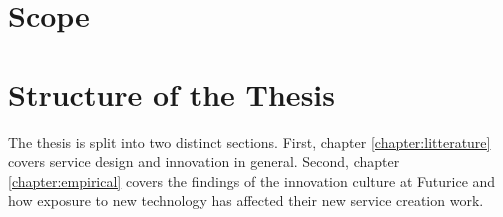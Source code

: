 \section{Scope}
\label{section:scope}




\section{Structure of the Thesis}
\label{section:structure}

The thesis is split into two distinct sections. First, chapter \ref{chapter:litterature} covers service design and innovation in general. Second, chapter \ref{chapter:empirical} covers the findings of the innovation culture at Futurice and how exposure to new technology has affected their new service creation work.


